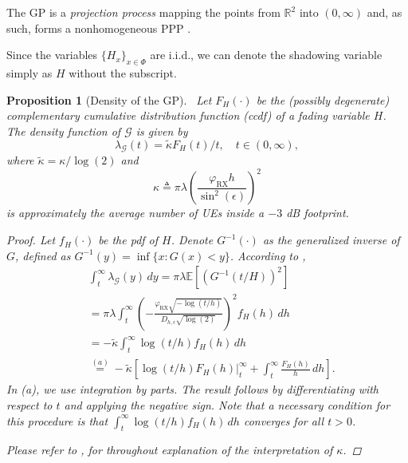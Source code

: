 \documentclass[lettersize,journal]{IEEEtran}
\newtheorem{prop}[theorem]{Proposition}
\begin{document}
The GP is a \textit{projection process} mapping the points from $\mathbb{R}^2$ into $(0,\infty)$ and, as such, forms a nonhomogeneous PPP \cite[Section 4.2.5]{alma998193414406526}.



Since the variables $\{H_x\}_{x \in \Phi}$ are i.i.d., we can denote the shadowing variable simply as $H$ without the subscript.
\begin{prop}[Density of the GP]\
  Let $F_H(\cdot)$ be the (possibly degenerate) complementary cumulative distribution function (ccdf) of a fading variable $H$. The density function of $\mathcal{G}$ is given by
  \begin{equation}
    \label{eq:GPdensity}
    \lambda_{\mathcal{G}}(t) = \tilde{\kappa} {F_H(t)}/{t}, \quad t \in (0, \infty),
  \end{equation}
  where $\tilde{\kappa} = {\kappa}/{\log(2)}$ and
  \begin{equation}\kappa \triangleq \pi \lambda \left(\frac{\varphi_{\text{RX}}h}{\sin^2(\epsilon)}\right)^2
    \label{eq:kappa}
  \end{equation}
  is approximately the average number of UEs inside a $-3$ dB footprint.

  
  \begin{proof}
    Let $f_H(\cdot)$ be the pdf of $H$. Denote $G^{-1}(\cdot)$ as the generalized inverse of $G$, defined as $G^{-1}(y) = \inf \{x : G(x) < y\}$. According to \cite[Eq. 4.55]{alma998193414406526},
    \begin{align*}
      &\int_t^{\infty} \lambda_{\mathcal{G}}(y) \, dy = \pi \lambda \mathbb{E}\left[ \left({G^{-1}(t/H)}{}\right)^2 \right] \\
      &= \pi \lambda \int_t^{\infty} \left(-\frac{\varphi_{\text{RX}} \sqrt{-\log(t/h)}}{D_{h,\epsilon} \sqrt{\log(2)}}\right)^2 f_H(h) \, dh \\
      &= -\tilde{\kappa} \int_t^{\infty} \log(t/h) f_H(h) \, dh \\
      &\overset{(a)}{=} -\tilde{\kappa} \left[ \left. \log(t/h) F_H(h) \right|_t^{\infty} + \int_t^{\infty} \frac{F_H(h)}{h} \, dh \right].
    \end{align*}
    In (a), we use integration by parts. The result follows by differentiating with respect to $t$ and applying the negative sign. Note that a necessary condition for this procedure is that $\int_t^{\infty} \log(t/h) f_H(h) \, dh$ converges for all $t > 0$.
    
    Please refer to \cite[Lemma 1]{10909705}, for throughout explanation of the interpretation of $\kappa$.
  \end{proof}
\end{prop}
\end{document}
